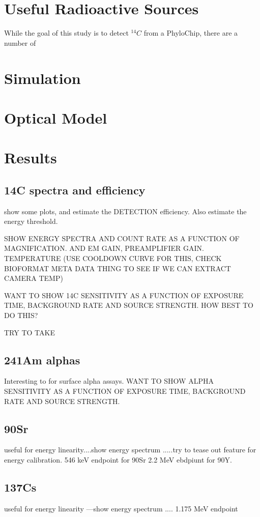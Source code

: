 \documentclass[11pt]{amsart}
\begin{document}
\section{Useful Radioactive Sources} 
While the goal of this study is to detect $^{14}C$ from a PhyloChip, there are a number of 


\section{Simulation}

\section{Optical Model}



\section{Results}
\subsection{14C spectra and efficiency}
show some plots, and estimate the DETECTION efficiency. Also estimate the energy threshold.

SHOW ENERGY SPECTRA AND COUNT RATE AS A FUNCTION OF MAGNIFICATION. AND EM GAIN, PREAMPLIFIER GAIN.
TEMPERATURE (USE COOLDOWN CURVE FOR THIS, CHECK BIOFORMAT META DATA THING TO SEE IF WE CAN EXTRACT CAMERA TEMP) 

WANT TO SHOW 14C SENSITIVITY AS A FUNCTION OF EXPOSURE TIME, BACKGROUND RATE AND SOURCE STRENGTH.
HOW BEST TO DO THIS?
 
 TRY TO TAKE 
 
 
\subsection{241Am alphas} 
Interesting to for surface alpha assays. 
WANT TO SHOW ALPHA SENSITIVITY AS A FUNCTION OF EXPOSURE TIME, BACKGROUND RATE AND SOURCE STRENGTH.
 
 \subsection{90Sr}
 useful for energy linearity....show energy spectrum .....try to tease out feature for energy calibration.
 546 keV endpoint for 90Sr
 2.2 MeV ebdpiunt for 90Y.
 \subsection{137Cs}
 useful for energy linearity ---show energy spectrum ....
 1.175 MeV endpoint
\end{document}
